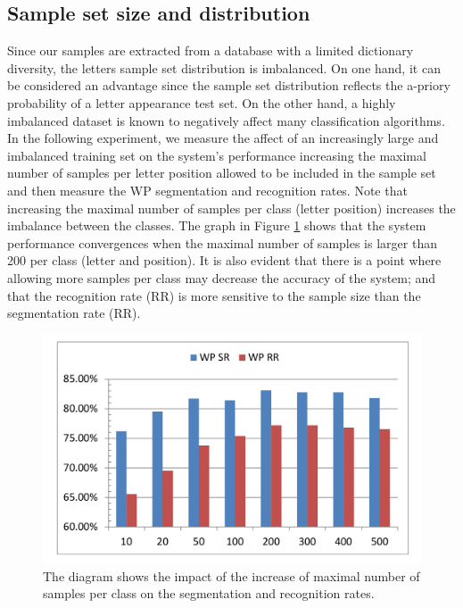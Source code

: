 \documentclass[10pt, conference, compsocconf]{IEEEtran}
\begin{document}
\subsection{Sample set size and distribution}
Since our samples are extracted from a database with a limited dictionary diversity, the letters sample set distribution is imbalanced. 
On one hand, it can be considered an advantage since the sample set distribution reflects the a-priory probability of a letter appearance test set. 
On the other hand, a highly imbalanced dataset is known to negatively affect many classification algorithms.
In the following experiment, we measure the affect of an increasingly large and imbalanced training set on the system's performance increasing the maximal number of samples per letter position allowed to be included in the sample set and then measure the WP segmentation and recognition rates. 
Note that increasing the maximal number of samples per class (letter position) increases the imbalance between the classes. 
The graph in Figure \ref{fig:num_letter_impact} shows that the system performance convergences when the maximal number of samples is larger than 200 per class (letter and position). 
It is also evident that there is a point where allowing more samples per class may decrease the accuracy of the system;
and that the recognition rate (RR) is more sensitive to the sample size than the segmentation rate (RR). \\

\begin{figure}
\centering
\includegraphics[width=0.9\columnwidth]{./figures/num_letter_impact}
\caption{The diagram shows the impact of the increase of maximal number of samples per class on the segmentation and recognition rates.}
\label{fig:num_letter_impact}
\end{figure}
\end{document}
